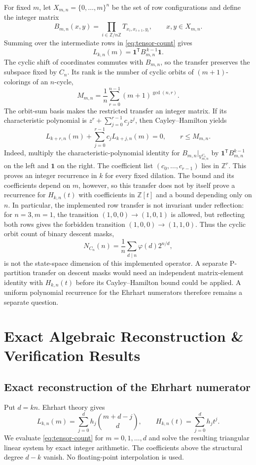 \documentclass[11pt,a4paper]{article}
\theoremstyle{definition}
\begin{document}
For fixed $m$, let $X_{m,n}=\{0,\ldots,m\}^n$ be the set of row
configurations and define the integer matrix
\[
B_{m,n}(x,y)=\prod_{i\in\mathbb Z/n\mathbb Z}
T_{x_i,x_{i+1},y_i},
\qquad x,y\in X_{m,n}.
\]
Summing over the intermediate rows in \eqref{eq:tensor-count} gives
\[
L_{k,n}(m)=\mathbf 1^{\mathsf T}B_{m,n}^{\,k-1}\mathbf 1.
\]
The cyclic shift of coordinates commutes with $B_{m,n}$, so the transfer
preserves the subspace fixed by $C_n$. Its rank is the number of cyclic
orbits of $(m+1)$-colorings of an $n$-cycle,
\[
M_{m,n}=\frac1n\sum_{r=0}^{n-1}(m+1)^{\gcd(n,r)}.
\]
The orbit-sum basis makes the restricted transfer an integer matrix.
If its characteristic polynomial is
$z^{r}+\sum_{j=0}^{r-1}c_jz^j$, then
Cayley--Hamilton yields
\[
L_{k+r,n}(m)+\sum_{j=0}^{r-1}c_jL_{k+j,n}(m)=0,
\qquad r\le M_{m,n}.
\]
Indeed, multiply the characteristic-polynomial identity for
$B_{m,n}|_{V_{m,n}^{C_n}}$ by
$\mathbf 1^{\mathsf T}B_{m,n}^{k-1}$ on the left and $\mathbf 1$ on the
right. The coefficient list $(c_0,\ldots,c_{r-1})$ lies in
$\mathbb Z^{r}$.
This proves an integer recurrence in $k$ for every fixed dilation.
The bound and its coefficients depend on $m$, however, so this transfer
does not by itself prove a recurrence for $H_{k,n}(t)$ with coefficients
in $\mathbb Z[t]$ and a bound depending only on $n$. In particular, the
implemented row transfer is not invariant under reflection: for
$n=3,m=1$, the transition $(1,0,0)\to(1,0,1)$ is allowed, but reflecting
both rows gives the forbidden transition $(1,0,0)\to(1,1,0)$. Thus the
cyclic orbit count of binary descent masks,
\[
N_{C_n}(n)=\frac1n\sum_{d\mid n}\varphi(d)2^{n/d},
\]
is not the state-space dimension of this implemented operator. A
separate P-partition transfer on descent masks would need an independent
matrix-element identity with $H_{k,n}(t)$ before its
Cayley--Hamilton bound could be applied. A uniform polynomial recurrence
for the Ehrhart numerators therefore remains a separate question.

\section{Exact Algebraic Reconstruction \& Verification Results}

\subsection{Exact reconstruction of the Ehrhart numerator}

Put $d=kn$. Ehrhart theory gives
\begin{equation}\label{eq:binomial-basis}
L_{k,n}(m)=\sum_{j=0}^{d}h_j\binom{m+d-j}{d},
\qquad H_{k,n}(t)=\sum_{j=0}^{d}h_jt^j.
\end{equation}
We evaluate \eqref{eq:tensor-count} for $m=0,1,\ldots,d$ and solve the
resulting triangular linear system by exact integer arithmetic. The
coefficients above the structural degree $d-k$ vanish. No
floating-point interpolation is used.
\end{document}
